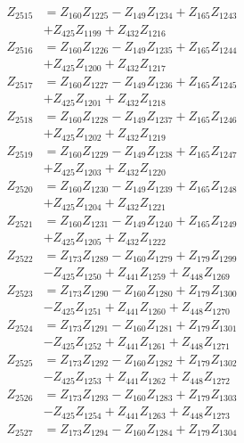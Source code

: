 \begin{multicols}{2}
\begin{align}
Z_{2515} &= Z_{160}Z_{1225} - Z_{149}Z_{1234} + Z_{165}Z_{1243}  \nonumber \\
&+ Z_{425}Z_{1199} + Z_{432}Z_{1216} \nonumber \\
Z_{2516} &= Z_{160}Z_{1226} - Z_{149}Z_{1235} + Z_{165}Z_{1244}  \nonumber \\
&+ Z_{425}Z_{1200} + Z_{432}Z_{1217} \nonumber \\
Z_{2517} &= Z_{160}Z_{1227} - Z_{149}Z_{1236} + Z_{165}Z_{1245}  \nonumber \\
&+ Z_{425}Z_{1201} + Z_{432}Z_{1218} \nonumber \\
Z_{2518} &= Z_{160}Z_{1228} - Z_{149}Z_{1237} + Z_{165}Z_{1246}  \nonumber \\
&+ Z_{425}Z_{1202} + Z_{432}Z_{1219} \nonumber \\
Z_{2519} &= Z_{160}Z_{1229} - Z_{149}Z_{1238} + Z_{165}Z_{1247}  \nonumber \\
&+ Z_{425}Z_{1203} + Z_{432}Z_{1220} \nonumber \\
Z_{2520} &= Z_{160}Z_{1230} - Z_{149}Z_{1239} + Z_{165}Z_{1248}  \nonumber \\
&+ Z_{425}Z_{1204} + Z_{432}Z_{1221} \nonumber \\
Z_{2521} &= Z_{160}Z_{1231} - Z_{149}Z_{1240} + Z_{165}Z_{1249}  \nonumber \\
&+ Z_{425}Z_{1205} + Z_{432}Z_{1222} \nonumber \\
Z_{2522} &= Z_{173}Z_{1289} - Z_{160}Z_{1279} + Z_{179}Z_{1299}  \nonumber \\
&- Z_{425}Z_{1250} + Z_{441}Z_{1259} + Z_{448}Z_{1269} \nonumber \\
Z_{2523} &= Z_{173}Z_{1290} - Z_{160}Z_{1280} + Z_{179}Z_{1300}  \nonumber \\
&- Z_{425}Z_{1251} + Z_{441}Z_{1260} + Z_{448}Z_{1270} \nonumber \\
Z_{2524} &= Z_{173}Z_{1291} - Z_{160}Z_{1281} + Z_{179}Z_{1301}  \nonumber \\
&- Z_{425}Z_{1252} + Z_{441}Z_{1261} + Z_{448}Z_{1271} \nonumber \\
Z_{2525} &= Z_{173}Z_{1292} - Z_{160}Z_{1282} + Z_{179}Z_{1302}  \nonumber \\
&- Z_{425}Z_{1253} + Z_{441}Z_{1262} + Z_{448}Z_{1272} \nonumber \\
Z_{2526} &= Z_{173}Z_{1293} - Z_{160}Z_{1283} + Z_{179}Z_{1303}  \nonumber \\
&- Z_{425}Z_{1254} + Z_{441}Z_{1263} + Z_{448}Z_{1273} \nonumber \\
Z_{2527} &= Z_{173}Z_{1294} - Z_{160}Z_{1284} + Z_{179}Z_{1304}  \nonumber \\

\end{align}
\end{multicols}
